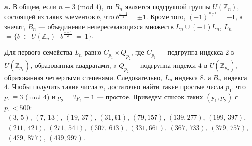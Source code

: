 \documentclass{mai_book}
\begin{document}
\textbf{a. } В общем, если $n \equiv 3$ (mod $4$), то $B_n$ является подгруппой группы $U(\mathbb{Z}_n)$, состоящей из таких элементов $b$, что $b^{\frac{n-1}{2}} = \pm 1$. Кроме того, $(-1)^{\frac{n-1}{2}} = -1$, а значит, $B_n$ --- объединение непересекающихся множеств $L_n \cup (-1)L_n$, $L_n~=$ $ = \{b~\in~U(\mathbb{Z}_n) ~|~b^{\frac{n-1}{2}}~=~1\}$.\par
Для первого семейства $L_n$ равно $C_{p_1} \times Q_{p_2}$, где $C_{p_1}$ --- подгруппа индекса $2$ в $U(\mathbb{Z}_{p_1})$, образованная квадратами, a $Q_{p_2}$ --- подгруппа индекса $4$ в $U(\mathbb{Z}_{p_2})$, образованная четвертыми степенями. Следовательно, $L_n$ индекса $8$, а $B_n$ индекса $4$. Чтобы получить такие числа $n$, достаточно найти такие простые числа $p_1$, что $p_1 \equiv 3$ (mod $4$) и $p_2 = 2p_1 - 1$ --- простое. Приведем список таких $(p_1, p_2)$ с $p_1 <500$:
\begin{gather*}
	(3,\,5),\,(7,\,13),\,(19,\,37),\,(31,61),\,(79,157),\,(139,277),\,(199,\,397), \\
	(211,\,421),\,(271,\,541),\,(307,\,613),\,(331,661),\,(367,\,733),\,(379,\,757), \\
	(439,\,877),\,(499,997).
\end{gather*}
\end{document}
